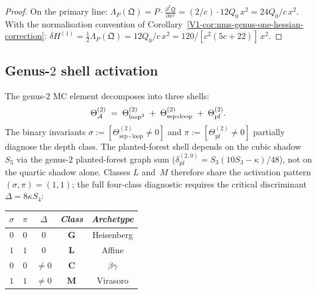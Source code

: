 \begin{proof}
On the primary line: $\Lambda_P(\mathfrak{Q}) =
P\cdot\frac{\partial^2\mathfrak{Q}}{\partial x^2}
= (2/c)\cdot 12Q_0\,x^2 = 24Q_0/c\,x^2$.
With the normalisation convention of
Corollary~\ref{V1-cor:nms-genus-one-hessian-correction}:
$\delta H^{(1)} = \frac{1}{2}\Lambda_P(\mathfrak{Q})
= 12Q_0/c\,x^2 = 120/[c^2(5c+22)]\,x^2$.
\end{proof}



\subsection{Genus-$2$ shell activation}

\begin{theorem}
\ClaimStatusProvedHere
{}
The genus-$2$ MC element decomposes into three shells:
\begin{equation}%
\Theta_\cA^{(2)}
\;=\;
\Theta^{(2)}_{\mathrm{loop}^2}
\;+\;
\Theta^{(2)}_{\mathrm{sep}\circ\mathrm{loop}}
\;+\;
\Theta^{(2)}_{\mathrm{pf}}.
\end{equation}
The binary invariants
$\sigma := [\Theta^{(2)}_{\mathrm{sep}\circ\mathrm{loop}} \neq 0]$
and
$\pi := [\Theta^{(2)}_{\mathrm{pf}} \neq 0]$
partially diagnose the depth class. The planted-forest shell
depends on the cubic shadow~$S_3$ via the genus-$2$ planted-forest
graph sum ($\delta_{\mathrm{pf}}^{(2,0)} = S_3(10S_3 - \kappa)/48$),
not on the quartic shadow alone. Classes $L$ and~$M$ therefore share
the activation pattern $(\sigma, \pi) = (1,1)$; the full four-class
diagnostic requires the critical discriminant
$\Delta = 8\kappa S_4$:
\begin{center}
\small
\renewcommand{\arraystretch}{1.15}
\begin{tabular}{ccccc}
\toprule
$\sigma$ & $\pi$ & $\Delta$ & \emph{Class} & \emph{Archetype} \\
\midrule
$0$ & $0$ & $0$ & $\mathbf{G}$ & Heisenberg \\
$1$ & $1$ & $0$ & $\mathbf{L}$ & Affine \\
$0$ & $0$ & $\neq 0$ & $\mathbf{C}$ & $\beta\gamma$ \\
$1$ & $1$ & $\neq 0$ & $\mathbf{M}$ & Virasoro \\
\bottomrule
\end{tabular}
\end{center}
\end{theorem}

